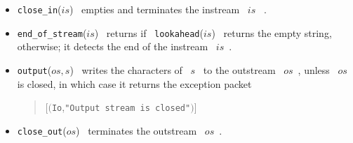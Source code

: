 \begin{itemize}
\begin{itemize}
             either supplies a character or closes the stream.
       \end{itemize}
\item  {\tt close\_in}($is$)~ empties and terminates the instream ~$is$~ .
\item  {\tt end\_of\_stream}($is$)~ returns {\TRUE} if 
       ~{\tt lookahead}($is$)~ returns the empty string, {\FALSE} otherwise; 
        it detects the end of the instream ~$is$~.
\item {\tt output}($os,s$)~ writes the characters of ~$s$~  to the outstream
       ~$os$~, unless ~$os$~ is closed, in which case it returns the exception
       packet
       \begin{quote}
       [$(${\tt Io},\verb+"Output stream is closed"+$)$]
       \end{quote}
\item  {\tt close\_out}($os$)~ terminates the outstream ~$os$~.
\end{itemize}
%


